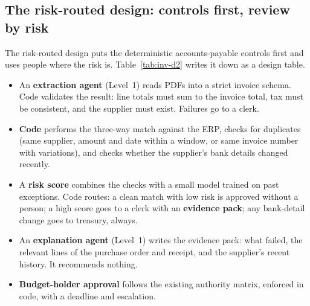 \subsection{The risk-routed design: controls first, review by risk}

The risk-routed design puts the deterministic accounts-payable controls first and uses people where the risk is. Table~\ref{tab:inv-d2} writes it down as a design table.
\begin{itemize}[itemsep=1pt]
  \item An \textbf{extraction agent} (Level~1) reads PDFs into a strict invoice schema. Code validates the result: line totals must sum to the invoice total, tax must be consistent, and the supplier must exist. Failures go to a clerk.
  \item \textbf{Code} performs the three-way match against the ERP, checks for duplicates (same supplier, amount and date within a window, or same invoice number with variations), and checks whether the supplier's bank details changed recently.
  \item A \textbf{risk score} combines the checks with a small model trained on past exceptions. Code routes: a clean match with low risk is approved without a person; a high score goes to a clerk with an \textbf{evidence pack}; any bank-detail change goes to treasury, always.
  \item An \textbf{explanation agent} (Level~1) writes the evidence pack: what failed, the relevant lines of the purchase order and receipt, and the supplier's recent history. It recommends nothing.
  \item \textbf{Budget-holder approval} follows the existing authority matrix, enforced in code, with a deadline and escalation.
\end{itemize}

